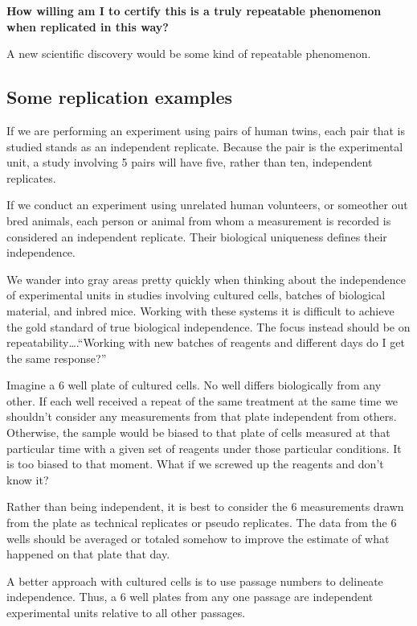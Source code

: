 \documentclass[]{book}
\begin{document}
\textbf{How willing am I to certify this is a truly repeatable phenomenon when replicated in this way?}

A new scientific discovery would be some kind of repeatable phenomenon.

\hypertarget{some-replication-examples}{%
\subsection{Some replication examples}\label{some-replication-examples}}

If we are performing an experiment using pairs of human twins, each pair that is studied stands as an independent replicate. Because the pair is the experimental unit, a study involving 5 pairs will have five, rather than ten, independent replicates.

If we conduct an experiment using unrelated human volunteers, or someother out bred animals, each person or animal from whom a measurement is recorded is considered an independent replicate. Their biological uniqueness defines their independence.

We wander into gray areas pretty quickly when thinking about the independence of experimental units in studies involving cultured cells, batches of biological material, and inbred mice. Working with these systems it is difficult to achieve the gold standard of true biological independence. The focus instead should be on repeatability\ldots{}.``Working with new batches of reagents and different days do I get the same response?''

Imagine a 6 well plate of cultured cells. No well differs biologically from any other. If each well received a repeat of the same treatment at the same time we shouldn't consider any measurements from that plate independent from others. Otherwise, the sample would be biased to that plate of cells measured at that particular time with a given set of reagents under those particular conditions. It is too biased to that moment. What if we screwed up the reagents and don't know it?

Rather than being independent, it is best to consider the 6 measurements drawn from the plate as technical replicates or pseudo replicates. The data from the 6 wells should be averaged or totaled somehow to improve the estimate of what happened on that plate that day.

A better approach with cultured cells is to use passage numbers to delineate independence. Thus, a 6 well plates from any one passage are independent experimental units relative to all other passages.
\end{document}
